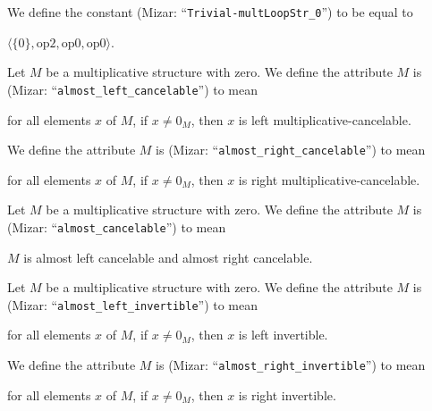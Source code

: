 \documentclass{article}
\begin{document}
\begin{definition}
We define the constant  (Mizar: ``\verb#Trivial-multLoopStr_0#'') to be equal to
\begin{defn}%
\item $\langle\{0\},\mbox{op2},\mbox{op0},\mbox{op0}\rangle$.
\end{defn}
\end{definition}

\skipdefn{}%

\begin{definition}
Let $M$ be a multiplicative structure with zero.
We define the attribute $M$ is 
(Mizar: ``\verb#almost_left_cancelable#'')
to mean
\begin{defn}
\item for all elements $x$ of $M$, if $x\neq0_{M}$, then $x$ is left multiplicative-cancelable.
\end{defn}
We define the attribute $M$ is 
(Mizar: ``\verb#almost_right_cancelable#'')
to mean
\begin{defn}
\item for all elements $x$ of $M$, if $x\neq0_{M}$, then $x$ is right multiplicative-cancelable.
\end{defn}
\end{definition}

\begin{definition}
Let $M$ be a multiplicative structure with zero.
We define the attribute $M$ is  (Mizar: ``\verb#almost_cancelable#'')
to mean
\begin{defn}
\item $M$ is almost left cancelable and almost right cancelable.
\end{defn}
\end{definition}

\begin{definition}
Let $M$ be a multiplicative structure with zero.
We define the attribute $M$ is 
(Mizar: ``\verb#almost_left_invertible#'')
to mean
\begin{defn}%
\item for all elements $x$ of $M$, if $x\neq0_{M}$, then $x$ is left invertible.
\end{defn}
We define the attribute $M$ is 
(Mizar: ``\verb#almost_right_invertible#'')
to mean
\begin{defn}%
\item for all elements $x$ of $M$, if $x\neq0_{M}$, then $x$ is right invertible.
\end{defn}
\end{definition}
\end{document}
